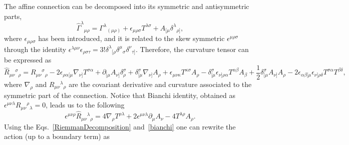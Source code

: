 \documentclass[twocolumn,aps,
  showpacs,showkeys,prd,superscriptaddress]{revtex4-1}
\renewcommand{\(}{\left(}
\renewcommand{\)}{\right)}
\renewcommand{\[}{\left[}
\renewcommand{\]}{\right]}
\newcommand{\dn}[2]{\,{\mathrm{d}}^{#1}\!{#2}\;}
\begin{document}
The affine connection can be decomposed into its symmetric and antisymmetric parts, 
\begin{equation}
  \hat{\Gamma}^\lambda{}_{\mu\rho} = {\Gamma}^\lambda{}_{(\mu\rho)} + \epsilon_{\mu\rho\sigma}T^{\lambda\sigma} + A_{[\mu}\delta^\lambda{}_{\rho]},
\end{equation}
where  $\epsilon_{\mu\rho\sigma}$ has been introduced, and it is related to the skew symmetric $\epsilon^{\mu\rho\sigma}$ through the identity \mbox{$\epsilon^{\lambda\mu\nu}\epsilon_{\rho\sigma\tau}=3!\delta^{\lambda}{}_{[\rho}\delta^\mu{}_{\sigma}\delta^{\nu}{}_{\tau]}$.} Therefore, the curvature tensor can be expressed as 
\begin{dmath}
  \label{RiemmanDecomposition}
  \hat{R}_{\mu\nu}{}^\sigma{}_\rho=
  {R}_{\mu\nu}{}^\sigma{}_\rho
  -2\epsilon_{\rho\alpha[\mu}\nabla_{\nu]}T^{\sigma\alpha}
  +\partial_{[\mu}A_{\nu]}\delta^\sigma_\rho
  +\delta^\sigma_{[\mu}\nabla_{\nu]}A_\rho
  +\epsilon_{\mu\nu\kappa}T^{\kappa\sigma}A_\rho
  -\delta^\sigma_{[\mu}\epsilon_{\nu]\rho\alpha}T^{\alpha\beta}A_\beta 
  +\frac{1}{2}\delta^\sigma_{[\mu}A_{\nu]}A_\rho
  -2\epsilon_{\alpha\beta[\mu}\epsilon_{\nu]\rho\delta}T^{\sigma\alpha}T^{\beta\delta},
\end{dmath}
where $\nabla_\rho$ and ${R}_{\mu\nu}{}^\lambda{}_\rho$ are the covariant derivative and  curvature associated to the symmetric part of the connection. Notice that Bianchi identity, obtained as $\epsilon^{\mu\nu\lambda} R_{\mu\nu}{}^\rho{}_\lambda=0$, leads us to the following
\begin{equation}
  \label{bianchi}
  \epsilon^{\mu\nu\rho} \hat{R}_{\mu\nu}{}^\lambda{}_\rho = 4\nabla_\rho T^{\rho\lambda}
  +2\epsilon^{\mu\nu\lambda}\partial_\mu A_\nu-4T^{\lambda\rho}A_\rho. 
\end{equation}
Using the  Eqs.~\eqref{RiemmanDecomposition} and~\eqref{bianchi} one can rewrite the action (up to a boundary term) as
\end{document}
